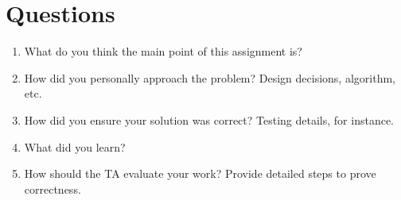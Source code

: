 \documentclass[letterpaper,10pt,fleqn]{article}
\begin{document}
\section*{Questions}
\begin{enumerate}
\item What do you think the main point of this assignment is?



\item How did you personally approach the problem? Design decisions, algorithm, etc. 



\item How did you ensure your solution was correct? Testing details, for instance. 



\item What did you learn? 



\item How should the TA evaluate your work? Provide detailed steps to prove correctness.



\end{enumerate}
\end{document}
